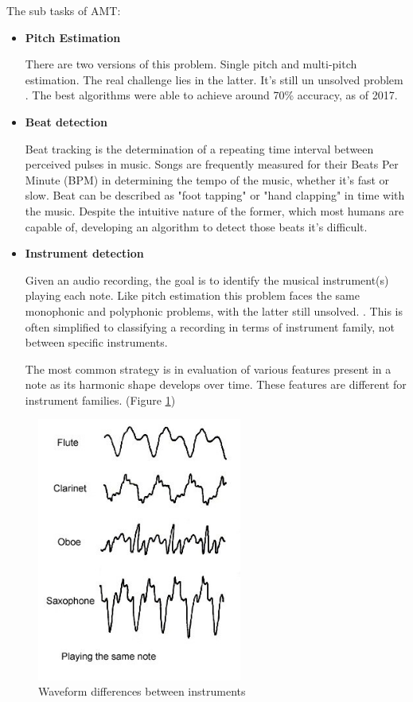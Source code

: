 \par
The sub tasks of AMT:
\begin{itemize}
	\item \textbf{Pitch Estimation}
	\par
	There are two versions of this problem. Single pitch and multi-pitch estimation. The real challenge lies in the latter. It's still un unsolved problem \cite{glass_ceiling}.
	The best algorithms were able to achieve around 70\% accuracy, as of 2017. \cite{music_retrieval}
	\item \textbf{Beat detection}
	\par
	Beat tracking is the determination of a repeating time interval between perceived pulses in music. \cite{transcription}
	Songs are frequently measured for their Beats Per Minute (BPM) in determining the tempo of the music, whether it's fast or slow.
	Beat can be described as "foot tapping" or "hand clapping" in time with the music. Despite the intuitive nature of the former, which most humans are capable of, developing an algorithm to detect those beats it's difficult.
	\item \textbf{Instrument detection}
	\par
	Given an audio recording, the goal is to identify the musical instrument(s) playing each note. Like pitch estimation this problem faces the same monophonic and polyphonic problems, with the latter still unsolved. \cite{instrument_identification}. This is often simplified to classifying a recording in terms of instrument family, not between specific instruments.
	\par
	The most common strategy is in evaluation of various features present in a note as its harmonic shape develops over time. These features are different for instrument families. (Figure \ref{fig:instruments})
\end{itemize}

\begin{figure}[h]
	\caption[Waveform differences between instruments]{Waveform differences between instruments \cite{waves_instruments}}
	\centering
	\label{fig:instruments}
	\includegraphics[width=0.6\textwidth, height=0.4\textheight, keepaspectratio]{"resources/instruments"}
\end{figure}

